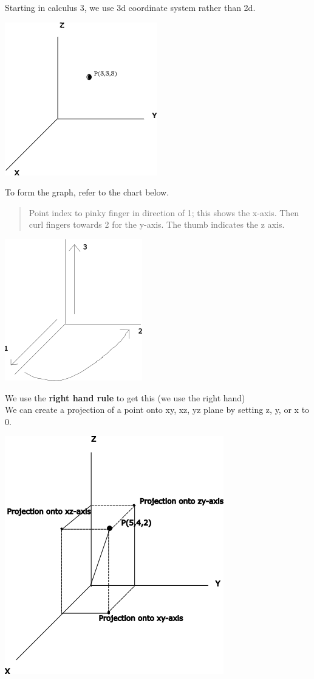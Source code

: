\documentclass[12pt]{article}
\begin{document}
Starting in calculus 3, we use 3d coordinate system rather than 2d.

\includegraphics{3dgraph.png}

To form the graph, refer to the chart below.
\begin{quote}
	Point index to pinky finger in direction of 1; this shows the x-axis.
Then curl fingers towards 2 for the y-axis. The thumb indicates the z axis.	
\end{quote}

\includegraphics{howtomakegraph}

We use the \textbf{right hand rule} to get this (we use the right hand)\\
We can create a projection of a point onto xy, xz, yz plane by setting z, y, or x to 0. 

\includegraphics{projections-onto-3daxes}
\end{document}
